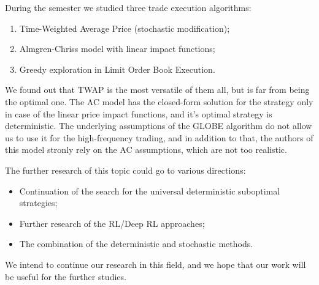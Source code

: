 \conclusion %
    During the semester we studied three trade execution algorithms:
    \begin{enumerate}
        \item Time-Weighted Average Price (stochastic modification);
        \item Almgren-Chriss model with linear impact functions;
        \item Greedy exploration in Limit Order Book Execution.
    \end{enumerate}
    We found out that TWAP is the most versatile of them all, but is far from being the optimal one. 
    The AC model has the closed-form solution for the strategy only in case of the 
    linear price impact functions, and it's optimal strategy is deterministic.
    The underlying assumptions of the GLOBE algorithm do not allow us to use it for the high-frequency trading, and in 
    addition to that, the authors of this model stronly rely on the AC assumptions, which are not too realistic. 

    The further research of this topic could go to various directions:
    \begin{itemize}
        \item Continuation of the search for the universal deterministic suboptimal strategies;
        \item Further research of the RL/Deep RL approaches;
        \item The combination of the deterministic and stochastic methods.
    \end{itemize}

    We intend to continue our research in this field, and we hope that our work will be useful for the further studies.